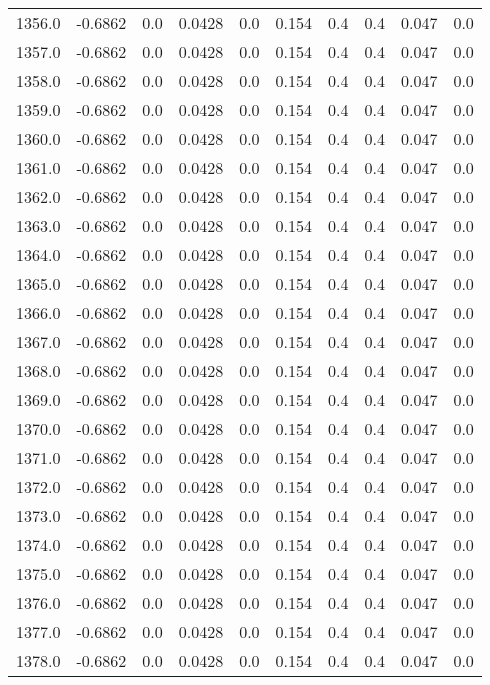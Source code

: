 \begin{longtable}{lrrrrrrrrr}
1356.0 & -0.6862 & 0.0 & 0.0428 & 0.0 & 0.154 & 0.4 & 0.4 & 0.047 & 0.0 \\
1357.0 & -0.6862 & 0.0 & 0.0428 & 0.0 & 0.154 & 0.4 & 0.4 & 0.047 & 0.0 \\
1358.0 & -0.6862 & 0.0 & 0.0428 & 0.0 & 0.154 & 0.4 & 0.4 & 0.047 & 0.0 \\
1359.0 & -0.6862 & 0.0 & 0.0428 & 0.0 & 0.154 & 0.4 & 0.4 & 0.047 & 0.0 \\
1360.0 & -0.6862 & 0.0 & 0.0428 & 0.0 & 0.154 & 0.4 & 0.4 & 0.047 & 0.0 \\
1361.0 & -0.6862 & 0.0 & 0.0428 & 0.0 & 0.154 & 0.4 & 0.4 & 0.047 & 0.0 \\
1362.0 & -0.6862 & 0.0 & 0.0428 & 0.0 & 0.154 & 0.4 & 0.4 & 0.047 & 0.0 \\
1363.0 & -0.6862 & 0.0 & 0.0428 & 0.0 & 0.154 & 0.4 & 0.4 & 0.047 & 0.0 \\
1364.0 & -0.6862 & 0.0 & 0.0428 & 0.0 & 0.154 & 0.4 & 0.4 & 0.047 & 0.0 \\
1365.0 & -0.6862 & 0.0 & 0.0428 & 0.0 & 0.154 & 0.4 & 0.4 & 0.047 & 0.0 \\
1366.0 & -0.6862 & 0.0 & 0.0428 & 0.0 & 0.154 & 0.4 & 0.4 & 0.047 & 0.0 \\
1367.0 & -0.6862 & 0.0 & 0.0428 & 0.0 & 0.154 & 0.4 & 0.4 & 0.047 & 0.0 \\
1368.0 & -0.6862 & 0.0 & 0.0428 & 0.0 & 0.154 & 0.4 & 0.4 & 0.047 & 0.0 \\
1369.0 & -0.6862 & 0.0 & 0.0428 & 0.0 & 0.154 & 0.4 & 0.4 & 0.047 & 0.0 \\
1370.0 & -0.6862 & 0.0 & 0.0428 & 0.0 & 0.154 & 0.4 & 0.4 & 0.047 & 0.0 \\
1371.0 & -0.6862 & 0.0 & 0.0428 & 0.0 & 0.154 & 0.4 & 0.4 & 0.047 & 0.0 \\
1372.0 & -0.6862 & 0.0 & 0.0428 & 0.0 & 0.154 & 0.4 & 0.4 & 0.047 & 0.0 \\
1373.0 & -0.6862 & 0.0 & 0.0428 & 0.0 & 0.154 & 0.4 & 0.4 & 0.047 & 0.0 \\
1374.0 & -0.6862 & 0.0 & 0.0428 & 0.0 & 0.154 & 0.4 & 0.4 & 0.047 & 0.0 \\
1375.0 & -0.6862 & 0.0 & 0.0428 & 0.0 & 0.154 & 0.4 & 0.4 & 0.047 & 0.0 \\
1376.0 & -0.6862 & 0.0 & 0.0428 & 0.0 & 0.154 & 0.4 & 0.4 & 0.047 & 0.0 \\
1377.0 & -0.6862 & 0.0 & 0.0428 & 0.0 & 0.154 & 0.4 & 0.4 & 0.047 & 0.0 \\
1378.0 & -0.6862 & 0.0 & 0.0428 & 0.0 & 0.154 & 0.4 & 0.4 & 0.047 & 0.0 \\

\end{longtable}
